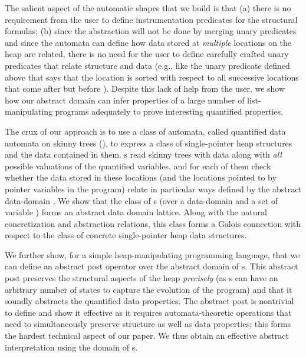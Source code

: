 \documentclass{llncs}
\begin{document}
The salient aspect of the automatic shapes that we build is that (a) there is no requirement
from the user to define instrumentation predicates for the structural 
formulas; (b) since the abstraction will not be done by merging unary predicates and since
the automata can define how data stored at \emph{multiple} locations on the heap are related,
there is no need for the user to define carefully crafted unary predicates that relate structure and data
(e.g., like the unary predicate  defined above that says that the location  is sorted with respect
to all successive locations that come after  but before ). Despite this lack of help
from the user, we show how our abstract domain can infer properties of a large number
of list-manipulating programs adequately to prove interesting quantified properties.



The crux of our approach is to use a class of automata, called quantified data automata on skinny trees (\QSDA),
to express a class of single-pointer heap structures and the data contained in them. \QSDA s read skinny
trees with data along with \emph{all} possible valuations of the quantified variables, and for each of them
check whether the data stored in these locations (and the locations pointed to by pointer variables in the
program) relate in particular ways defined by the abstract data-domain . We show that the
class of \QSDA s (over a data-domain  and a set of variable ) forms an abstract
data domain lattice. Along with the natural concretization and abstraction relations, this class forms
a Galois connection with respect to the class of concrete single-pointer heap data structures.



We further show, for a simple heap-manipulating programming language, that we can define an abstract
post operator over the abstract domain of \QSDA s. This abstract post preserves the structural aspects of the
heap \emph{precisely} (as \QSDA s can have an arbitrary number of states to capture the evolution of the
program) and that it soundly abstracts the quantified data properties. The abstract post is nontrivial
to define and show it effective as it requires automata-theoretic operations that need to simultaneously
preserve structure as well as data properties; this forms the hardest technical aspect of our paper.
We thus obtain an effective abstract interpretation using the domain of \QSDA s.
\end{document}
